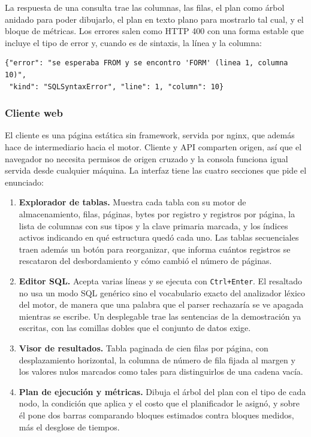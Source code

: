 \documentclass[a4paper,12pt]{article}
\begin{document}
La respuesta de una consulta trae las columnas, las filas, el plan como árbol
anidado para poder dibujarlo, el plan en texto plano para mostrarlo tal cual, y
el bloque de métricas. Los errores salen como HTTP 400 con una forma estable que
incluye el tipo de error y, cuando es de sintaxis, la línea y la columna:

\begin{lstlisting}[caption={Respuesta de error}]
{"error": "se esperaba FROM y se encontro 'FORM' (linea 1, columna 10)",
 "kind": "SQLSyntaxError", "line": 1, "column": 10}
\end{lstlisting}

\subsubsection{Cliente web}

El cliente es una página estática sin framework, servida por nginx, que además
hace de intermediario hacia el motor. Cliente y API comparten origen, así que el
navegador no necesita permisos de origen cruzado y la consola funciona igual
servida desde cualquier máquina. La interfaz tiene las cuatro secciones que pide
el enunciado:

\begin{enumerate}
    \item \textbf{Explorador de tablas.} Muestra cada tabla con su motor de
    almacenamiento, filas, páginas, bytes por registro y registros por página,
    la lista de columnas con sus tipos y la clave primaria marcada, y los
    índices activos indicando en qué estructura quedó cada uno. Las tablas
    secuenciales traen además un botón para reorganizar, que informa cuántos
    registros se rescataron del desbordamiento y cómo cambió el número de
    páginas.

    \item \textbf{Editor SQL.} Acepta varias líneas y se ejecuta con
    \texttt{Ctrl+Enter}. El resaltado no usa un modo SQL genérico sino el
    vocabulario exacto del analizador léxico del motor, de manera que una
    palabra que el parser rechazaría se ve apagada mientras se escribe. Un
    desplegable trae las sentencias de la demostración ya escritas, con las
    comillas dobles que el conjunto de datos exige.

    \item \textbf{Visor de resultados.} Tabla paginada de cien filas por página,
    con desplazamiento horizontal, la columna de número de fila fijada al
    margen y los valores nulos marcados como tales para distinguirlos de una
    cadena vacía.

    \item \textbf{Plan de ejecución y métricas.} Dibuja el árbol del plan con el
    tipo de cada nodo, la condición que aplica y el costo que el planificador le
    asignó, y sobre él pone dos barras comparando bloques estimados contra
    bloques medidos, más el desglose de tiempos.
\end{enumerate}
\end{document}
